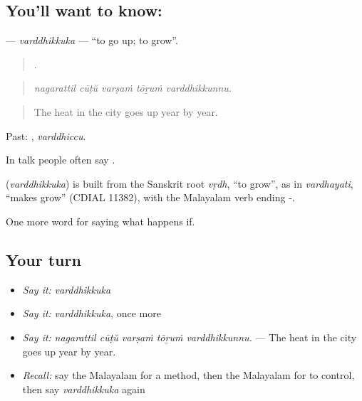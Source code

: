\subsection*{You'll want to know: }
\textbf{} — \emph{varddhikkuka} — \textquotedblleft{}to go up; to grow\textquotedblright{}.

\begin{quote}
    .
\end{quote}

\begin{quote}
\emph{nagarattil cūṭŭ varṣaṁ tōṟuṁ varddhikkunnu.}
\end{quote}

\begin{quote}
The heat in the city goes up year by year.
\end{quote}

Past: , \emph{varddhiccu}.

In talk people often say .

\begin{cousinweb}
\textbf{} (\emph{varddhikkuka}) is built from the Sanskrit root \emph{vṛdh}, \textquotedblleft{}to grow\textquotedblright{}, as in \emph{vardhayati}, \textquotedblleft{}makes grow\textquotedblright{} (CDIAL 11382), with the Malayalam verb ending -.
\end{cousinweb}

\begin{grammarlens}[title={What you've built}]
One more word for saying what happens if.
\end{grammarlens}

\subsection*{Your turn}
\begin{itemize}
\raggedright
  \item \emph{Say it:} \emph{varddhikkuka}
  \item \emph{Say it:} \emph{varddhikkuka}, once more
  \item \emph{Say it:} \emph{nagarattil cūṭŭ varṣaṁ tōṟuṁ varddhikkunnu.} — The heat in the city goes up year by year.
  \item \emph{Recall:} say the Malayalam for a method, then the Malayalam for to control, then say \emph{varddhikkuka} again
\end{itemize}


